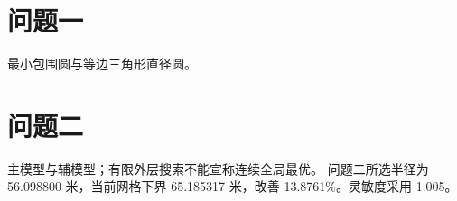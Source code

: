 \section{问题一}
\label{sec:b12-q1}
\label{eq:b12-mec}
最小包围圆与等边三角形直径圆。
\section{问题二}
\label{sec:b12-q2}
\label{eq:b12-lens}
主模型与辅模型；有限外层搜索不能宣称连续全局最优。
问题二所选半径为 56.098800 米，当前网格下界 65.185317 米，改善 13.8761\%。灵敏度采用 1.005。
